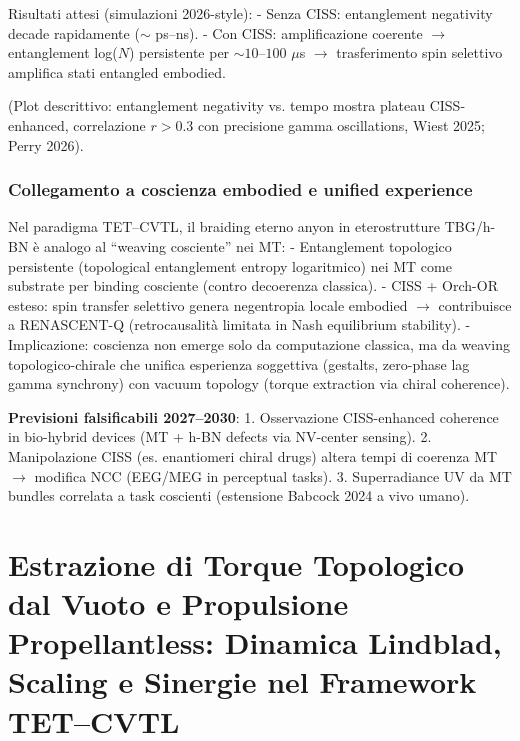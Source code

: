 \documentclass[11pt,a4paper]{article}
\theoremstyle{plain}
\theoremstyle{definition}
\begin{document}
Risultati attesi (simulazioni 2026-style):  
- Senza CISS: entanglement negativity decade rapidamente ($\sim$ ps--ns).  
- Con CISS: amplificazione coerente $\to$ entanglement log($N$) persistente per $\sim 10$--$100$ $\mu$s $\to$ trasferimento spin selettivo amplifica stati entangled embodied.  

(Plot descrittivo: entanglement negativity vs. tempo mostra plateau CISS-enhanced, correlazione $r > 0.3$ con precisione gamma oscillations, Wiest 2025; Perry 2026).

\vspace{0.4cm}

\subsubsection{Collegamento a coscienza embodied e unified experience}

Nel paradigma TET–CVTL, il braiding eterno anyon in eterostrutture TBG/h-BN è analogo al ``weaving cosciente'' nei MT:  
- Entanglement topologico persistente (topological entanglement entropy logaritmico) nei MT come substrate per binding cosciente (contro decoerenza classica).  
- CISS + Orch-OR esteso: spin transfer selettivo genera negentropia locale embodied $\to$ contribuisce a RENASCENT-Q (retrocausalità limitata in Nash equilibrium stability).  
- Implicazione: coscienza non emerge solo da computazione classica, ma da weaving topologico-chirale che unifica esperienza soggettiva (gestalts, zero-phase lag gamma synchrony) con vacuum topology (torque extraction via chiral coherence).

\textbf{Previsioni falsificabili 2027--2030}:  
1. Osservazione CISS-enhanced coherence in bio-hybrid devices (MT + h-BN defects via NV-center sensing).  
2. Manipolazione CISS (es. enantiomeri chiral drugs) altera tempi di coerenza MT $\to$ modifica NCC (EEG/MEG in perceptual tasks).  
3. Superradiance UV da MT bundles correlata a task coscienti (estensione Babcock 2024 a vivo umano).


\vspace{1cm}



\section{Estrazione di Torque Topologico dal Vuoto e Propulsione Propellantless: Dinamica Lindblad, Scaling e Sinergie nel Framework TET--CVTL}
\label{sec:vacuum-torque-propulsion}
\end{document}
